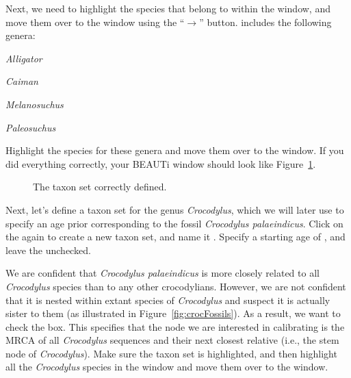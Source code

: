 {    Next, we need to highlight the species that belong to
     within the  window, and move
    them over to the  window using the ``$\to$'' button.
     includes the following genera:
    \begin{compactitem}
        \item \emph{Alligator}
        \item \emph{Caiman}
        \item \emph{Melanosuchus}
        \item \emph{Paleosuchus}
    \end{compactitem}
    Highlight the species for these genera and move them over to the
     window.
    If you did everything correctly, your BEAUTi window should look like
    Figure~\ref{fig:beautiAlligatoridae}.
    \begin{figure}[htbp]
        \centering
        \caption{The taxon set  correctly defined.}
        \label{fig:beautiAlligatoridae}
    \end{figure}

    Next, let's define a taxon set for the genus \emph{Crocodylus}, which we
    will later use to specify an age prior corresponding to the fossil
    \emph{Crocodylus palaeindicus}. Click on the \plusbutton again to create a
    new taxon set, and name it . Specify a starting age of
    , and leave the  unchecked.

    We are confident that \emph{Crocodylus palaeindicus} is more closely
    related to all \emph{Crocodylus} species than to any other crocodylians.
    However, we are not confident that it is nested within extant species of
    \emph{Crocodylus} and suspect it is actually sister to them (as illustrated
    in Figure~\ref{fig:crocFossils}). As a result, we want to check the
     box. This specifies that the node we are interested in
    calibrating is the MRCA of all \emph{Crocodylus} sequences and their next
    closest relative (i.e., the stem node of \emph{Crocodylus}).
    Make sure the  taxon set is highlighted, and then
    highlight all the \emph{Crocodylus} species in the 
    window and move them over to the  window.

}
